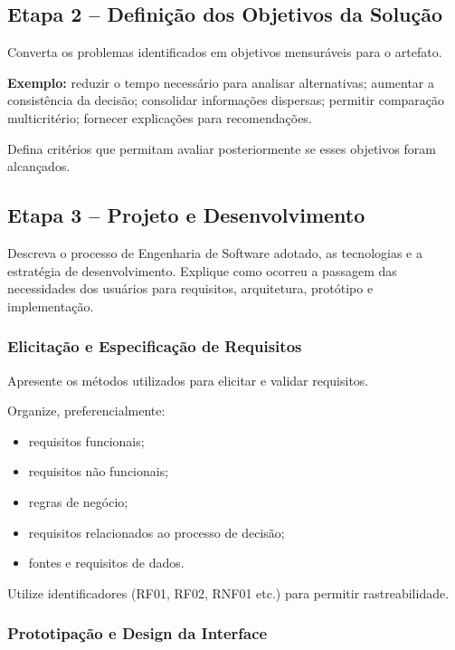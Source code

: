 \documentclass[12pt]{article}
\begin{document}
\subsection{Etapa 2 -- Definição dos Objetivos da Solução}

Converta os problemas identificados em objetivos mensuráveis para o artefato.

\textbf{Exemplo:} reduzir o tempo necessário para analisar alternativas; aumentar a consistência da decisão; consolidar informações dispersas; permitir comparação multicritério; fornecer explicações para recomendações.

Defina critérios que permitam avaliar posteriormente se esses objetivos foram alcançados.

\subsection{Etapa 3 -- Projeto e Desenvolvimento}

Descreva o processo de Engenharia de Software adotado, as tecnologias e a estratégia de desenvolvimento. Explique como ocorreu a passagem das necessidades dos usuários para requisitos, arquitetura, protótipo e implementação.

\subsubsection{Elicitação e Especificação de Requisitos}

Apresente os métodos utilizados para elicitar e validar requisitos.

Organize, preferencialmente:
\begin{itemize}[noitemsep]
    \item requisitos funcionais;
    \item requisitos não funcionais;
    \item regras de negócio;
    \item requisitos relacionados ao processo de decisão;
    \item fontes e requisitos de dados.
\end{itemize}

Utilize identificadores (RF01, RF02, RNF01 etc.) para permitir rastreabilidade.

\subsubsection{Prototipação e Design da Interface}
\end{document}
